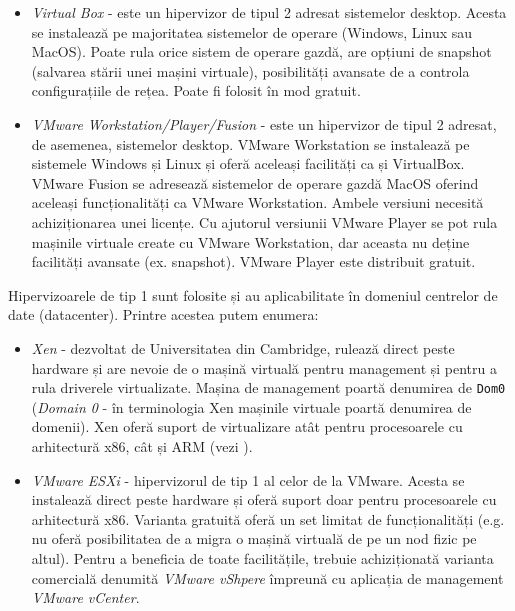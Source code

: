 \begin{itemize}
	\item \textit{Virtual Box} - este un hipervizor de tipul 2 adresat
		sistemelor desktop. Acesta se instalează pe majoritatea
		sistemelor de
		operare (Windows, Linux sau MacOS). Poate rula orice
		sistem de operare gazdă, are opțiuni de snapshot (salvarea
		stării unei mașini virtuale), posibilități avansate de a controla
		configurațiile de rețea. Poate fi folosit în mod gratuit.
	\item \textit{VMware Workstation/Player/Fusion} - este un hipervizor de
		tipul 2 adresat, de asemenea, sistemelor desktop. VMware
		Workstation se instalează pe sistemele Windows și Linux și oferă
		aceleași facilități ca și VirtualBox. VMware Fusion se adresează
		sistemelor de operare gazdă MacOS oferind aceleași
		funcționalități ca VMware Workstation. Ambele versiuni necesită
		achiziționarea unei licențe. Cu ajutorul versiunii VMware Player
		se pot rula mașinile virtuale create cu VMware
		Workstation, dar
		aceasta nu deține facilități avansate (ex. snapshot). VMware Player este
		distribuit gratuit.
\end{itemize}

Hipervizoarele de tip 1 sunt folosite și au aplicabilitate în domeniul centrelor
de date (datacenter). Printre acestea putem enumera:

\begin{itemize}
	\item \textit{Xen} - dezvoltat de Universitatea din Cambridge, rulează
		direct peste hardware și are nevoie de o mașină virtuală pentru
		management și pentru a rula driverele virtualizate. Mașina de
                management poartă denumirea de \texttt{Dom0} (\textit{Domain 0} - în terminologia
		Xen mașinile virtuale poartă denumirea de domenii). Xen oferă suport de virtualizare atât pentru procesoarele cu
		arhitectură x86, cât și ARM (vezi ).
	\item \textit{VMware ESXi} - hipervizorul de tip 1 al celor de la
		VMware. Acesta se instalează direct peste hardware și oferă
		suport doar pentru procesoarele cu arhitectură x86. Varianta
		gratuită oferă un set limitat de funcționalități (e.g. nu oferă
		posibilitatea de a migra o mașină virtuală de pe un nod fizic pe
		altul). Pentru a beneficia de toate facilitățile, trebuie
		achiziționată varianta comercială denumită \textit{VMware
		vShpere} împreună cu aplicația de management \textit{VMware
		vCenter}.
\end{itemize}

